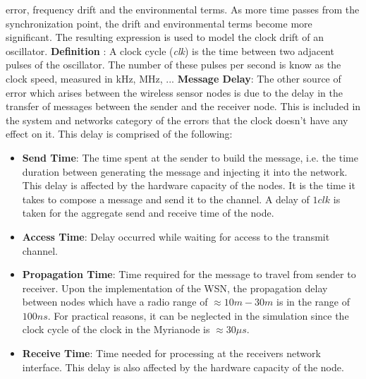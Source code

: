 \documentclass[a4paper,10pt]{report}
\begin{document}
error, frequency drift and the environmental terms. As more time
passes from the synchronization point, the drift and environmental
terms become more significant. The resulting expression is used to
model the clock drift of an oscillator.\newline
\textbf{Definition} : A clock cycle (\textit{clk}) is the time between two adjacent
pulses of the oscillator. The number of these pulses per second is
know as the clock speed, measured in kHz, MHz, ...
\newline \textbf{Message Delay}: The other source of error which arises
between the wireless sensor nodes is due to the delay in the
transfer of messages between the sender and the receiver node. This
is included in the system and networks category of the errors that
the clock doesn't have any effect on it. This delay is comprised of
the following:
\begin{itemize}
         \item \textbf{Send Time}: The time spent at the sender to build the
          message, i.e. the time duration between generating the message and injecting
            it into the network. This delay is affected by the hardware capacity
            of the nodes. It is the time it takes to compose a message and send it to
            the channel. A delay of $1clk$ is taken for
            the aggregate send and receive time of the node.
         \item \textbf{Access Time}: Delay occurred while waiting for access to the transmit channel.
         \item\textbf{Propagation Time}: Time required for the message to travel from sender to
            receiver. Upon the implementation of the WSN, the propagation delay between nodes which have a radio
range of $\approx 10m-30 m$ is in the range of $100 ns$. For
practical reasons, it can be neglected in the simulation since the
clock cycle of the clock in the Myrianode is $\approx 30 \mu s$.
         \item \textbf{Receive Time}: Time needed for processing at the receivers network interface.
         This delay is also affected by the hardware capacity of the
         node.
\end{itemize}
\end{document}

